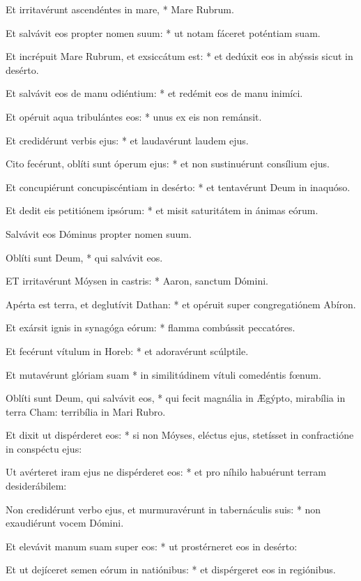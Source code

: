 Et irritavérunt ascendéntes in mare, * Mare Rubrum.

Et salvávit eos propter nomen suum: * ut notam fáceret poténtiam suam.

Et incrépuit Mare Rubrum, et exsiccátum est: * et dedúxit eos in abýssis sicut in desérto.

Et salvávit eos de manu odiéntium: * et redémit eos de manu inimíci.

Et opéruit aqua tribulántes eos: * unus ex eis non remánsit.

Et credidérunt verbis ejus: * et laudavérunt laudem ejus.

Cito fecérunt, oblíti sunt óperum ejus: * et non sustinuérunt consílium ejus.

Et concupiérunt concupiscéntiam in desérto: * et tentavérunt Deum in inaquóso.

Et dedit eis petitiónem ipsórum: * et misit saturitátem in ánimas eórum.

 Salvávit eos Dóminus propter nomen suum.

 Oblíti sunt Deum, * qui salvávit eos.


\lettrine[lines=2]{E}{T} irritavérunt Móysen in castris: * Aaron, sanctum Dómini.

Apérta est terra, et deglutívit Dathan: * et opéruit super congregatiónem Abíron.

Et exársit ignis in synagóga eórum: * flamma combússit peccatóres.

Et fecérunt vítulum in Horeb: * et adoravérunt scúlptile.

Et mutavérunt glóriam suam * in similitúdinem vítuli comedéntis fœnum.

Oblíti sunt Deum, qui salvávit eos, * qui fecit magnália in Ægýpto, mirabília in terra Cham: terribília in Mari Rubro.

Et dixit ut dispérderet eos: * si non Móyses, eléctus ejus, stetísset in confractióne in conspéctu ejus:

Ut avérteret iram ejus ne dispérderet eos: * et pro níhilo habuérunt terram desiderábilem:

Non credidérunt verbo ejus, et murmuravérunt in tabernáculis suis: * non exaudiérunt vocem Dómini.

Et elevávit manum suam super eos: * ut prostérneret eos in desérto:

Et ut dejíceret semen eórum in natiónibus: * et dispérgeret eos in regiónibus.

